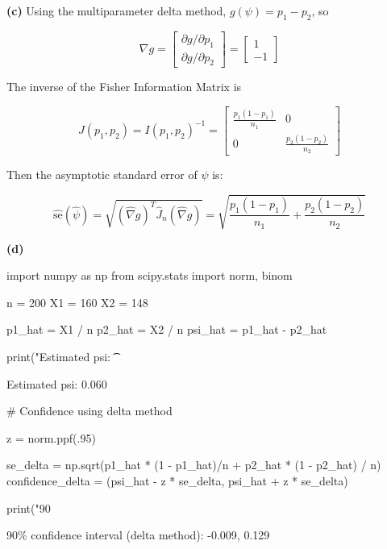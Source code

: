 \textbf{(c)} Using the multiparameter delta method,
\(g(\psi) = p_{1} - p_{2}\), so

\[ \nabla g = \begin{bmatrix}
\partial g / \partial p_{1} \\ \partial g / \partial p_{2}
\end{bmatrix}
= \begin{bmatrix}
1 \\ -1
\end{bmatrix}\]

The inverse of the Fisher Information Matrix is

\[J(p_{1}, p_{2}) = I(p_{1}, p_{2})^{-1} = \begin{bmatrix}
\frac{p_{1}(1 - p_{1})}{n_{1}} & 0 \\
0 & \frac{p_{2}(1 - p_{2})}{n_{2}}
\end{bmatrix}\]

Then the asymptotic standard error of \(\hat{\psi}\) is:

\[\hat{\text{se}}(\hat{\psi}) = \sqrt{(\hat{\nabla} g)^T \hat{J}_{n} (\hat{\nabla} g)}
= \sqrt{\frac{p_{1}(1 - p_{1})}{n_{1}} + \frac{p_{2}(1 - p_{2})}{n_{2}}}\]

\textbf{(d)}

\begin{python}
import numpy as np
from scipy.stats import norm, binom

n = 200
X1 = 160
X2 = 148
\end{python}

\begin{python}
p1_hat = X1 / n
p2_hat = X2 / n
psi_hat = p1_hat - p2_hat

print("Estimated psi: \t %
\end{python}

\begin{console}
Estimated psi:   0.060
\end{console}

\begin{python}
# Confidence using delta method

z = norm.ppf(.95)

se_delta = np.sqrt(p1_hat * (1 - p1_hat)/n + p2_hat * (1 - p2_hat) / n)
confidence_delta = (psi_hat - z * se_delta, psi_hat + z * se_delta)

print("90%
\end{python}

\begin{console}
90\% confidence interval (delta method):          -0.009, 0.129
\end{console}

